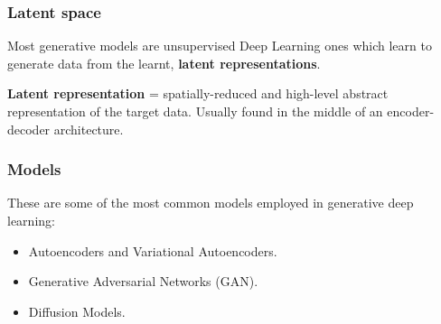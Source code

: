 \begin{frame}
    \frametitle{Latent space}
    Most generative models are unsupervised Deep Learning ones which learn to generate data from the learnt, \textbf{latent representations}.

    \textbf{Latent representation} = spatially-reduced and high-level abstract representation of the target data. Usually found in the middle of an encoder-decoder architecture.
\end{frame}

\begin{frame}
    \frametitle{Models}
    These are some of the most common models employed in generative deep learning:
    \begin{itemize}
        \item Autoencoders and Variational Autoencoders.
        \item Generative Adversarial Networks (GAN).
        \item Diffusion Models.
    \end{itemize}
\end{frame}
